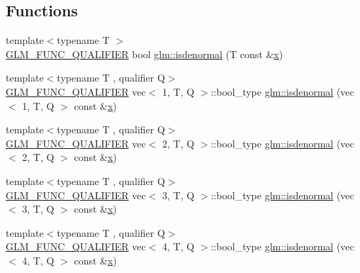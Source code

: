 \subsection*{Functions}
\begin{DoxyCompactItemize}
\item 
{\footnotesize template$<$typename T $>$ }\\\mbox{\hyperlink{setup_8hpp_a33fdea6f91c5f834105f7415e2a64407}{G\+L\+M\+\_\+\+F\+U\+N\+C\+\_\+\+Q\+U\+A\+L\+I\+F\+I\+ER}} bool \mbox{\hyperlink{namespaceglm_ae1eb587972c0a1c492f6c7026e34ca4f}{glm\+::isdenormal}} (T const \&\mbox{\hyperlink{_s_d_l__opengl_8h_ad0e63d0edcdbd3d79554076bf309fd47}{x}})
\item 
{\footnotesize template$<$typename T , qualifier Q$>$ }\\\mbox{\hyperlink{setup_8hpp_a33fdea6f91c5f834105f7415e2a64407}{G\+L\+M\+\_\+\+F\+U\+N\+C\+\_\+\+Q\+U\+A\+L\+I\+F\+I\+ER}} vec$<$ 1, T, Q $>$\+::bool\+\_\+type \mbox{\hyperlink{namespaceglm_a14e320da0485ce7d23a45748fae57144}{glm\+::isdenormal}} (vec$<$ 1, T, Q $>$ const \&\mbox{\hyperlink{_s_d_l__opengl_8h_ad0e63d0edcdbd3d79554076bf309fd47}{x}})
\item 
{\footnotesize template$<$typename T , qualifier Q$>$ }\\\mbox{\hyperlink{setup_8hpp_a33fdea6f91c5f834105f7415e2a64407}{G\+L\+M\+\_\+\+F\+U\+N\+C\+\_\+\+Q\+U\+A\+L\+I\+F\+I\+ER}} vec$<$ 2, T, Q $>$\+::bool\+\_\+type \mbox{\hyperlink{namespaceglm_af15f64cdc779db01e37f0697c5ba3816}{glm\+::isdenormal}} (vec$<$ 2, T, Q $>$ const \&\mbox{\hyperlink{_s_d_l__opengl_8h_ad0e63d0edcdbd3d79554076bf309fd47}{x}})
\item 
{\footnotesize template$<$typename T , qualifier Q$>$ }\\\mbox{\hyperlink{setup_8hpp_a33fdea6f91c5f834105f7415e2a64407}{G\+L\+M\+\_\+\+F\+U\+N\+C\+\_\+\+Q\+U\+A\+L\+I\+F\+I\+ER}} vec$<$ 3, T, Q $>$\+::bool\+\_\+type \mbox{\hyperlink{namespaceglm_ae915599e1e261353da94c10571ab2113}{glm\+::isdenormal}} (vec$<$ 3, T, Q $>$ const \&\mbox{\hyperlink{_s_d_l__opengl_8h_ad0e63d0edcdbd3d79554076bf309fd47}{x}})
\item 
{\footnotesize template$<$typename T , qualifier Q$>$ }\\\mbox{\hyperlink{setup_8hpp_a33fdea6f91c5f834105f7415e2a64407}{G\+L\+M\+\_\+\+F\+U\+N\+C\+\_\+\+Q\+U\+A\+L\+I\+F\+I\+ER}} vec$<$ 4, T, Q $>$\+::bool\+\_\+type \mbox{\hyperlink{namespaceglm_a5e520af4ed807f0b10cef96c7809e8d7}{glm\+::isdenormal}} (vec$<$ 4, T, Q $>$ const \&\mbox{\hyperlink{_s_d_l__opengl_8h_ad0e63d0edcdbd3d79554076bf309fd47}{x}})

\end{DoxyCompactItemize}
